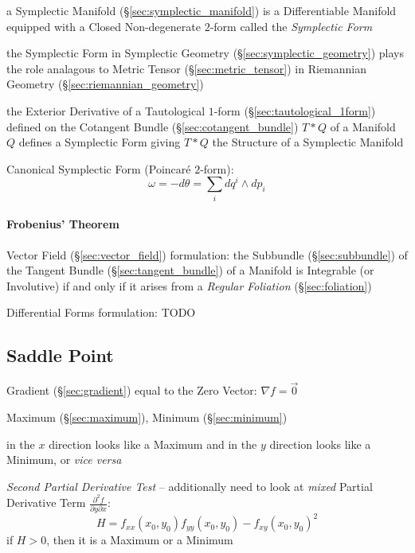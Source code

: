 a Symplectic Manifold (\S\ref{sec:symplectic_manifold}) is a Differentiable
Manifold equipped with a Closed Non-degenerate $2$-form called the
\emph{Symplectic Form}

the Symplectic Form in Symplectic Geometry (\S\ref{sec:symplectic_geometry})
plays the role analagous to Metric Tensor (\S\ref{sec:metric_tensor}) in
Riemannian Geometry (\S\ref{sec:riemannian_geometry})

the Exterior Derivative of a Tautological $1$-form
(\S\ref{sec:tautological_1form}) defined on the Cotangent Bundle
(\S\ref{sec:cotangent_bundle}) $T * Q$ of a Manifold $Q$ defines a Symplectic
Form giving $T * Q$ the Structure of a Symplectic Manifold

Canonical Symplectic Form (Poincar\'e $2$-form):
\[
  \omega = -d\theta = \sum_i dq^i \wedge dp_i
\]



\paragraph{Frobenius' Theorem}\label{sec:frobenius_theorem}\hfill

Vector Field (\S\ref{sec:vector_field}) formulation:
the Subbundle (\S\ref{sec:subbundle}) of the Tangent Bundle
(\S\ref{sec:tangent_bundle}) of a Manifold is Integrable (or Involutive) if and
only if it arises from a \emph{Regular Foliation} (\S\ref{sec:foliation})

Differential Forms formulation: TODO



\subsection{Saddle Point}\label{sec:saddle_point}

Gradient (\S\ref{sec:gradient}) equal to the Zero Vector: $\nabla{f} = \vec{0}$

Maximum (\S\ref{sec:maximum}), Minimum (\S\ref{sec:minimum})

in the $x$ direction looks like a Maximum and in the $y$ direction looks like a
Minimum, or \emph{vice versa}

\emph{Second Partial Derivative Test} -- additionally need to look at
\emph{mixed} Partial Derivative Term
$\frac{\partial^2{f}}{\partial{y}\partial{x}}$:
\[
  H = f_{xx}(x_0,y_0)f_{yy}(x_0,y_0) - f_{xy}(x_0,y_0)^2
\]
if $H > 0$, then it is a Maximum or a Minimum


